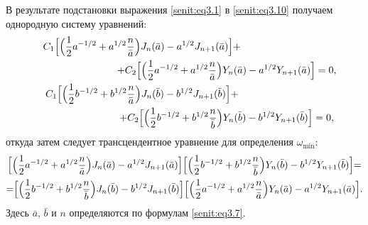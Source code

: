 В результате подстановки выражения \eqref{senit:eq3.1} в
\eqref{senit:eq3.10} получаем однородную систему уравнений:
\begin{gather*}
C_1 \Bigl[ \Bigl(\frac{1}{2} a^{-{1}/{2}}+a^{{1}/{2}}\frac{n}{\bar {a}} \Bigr)J_n
( \bar {a} )-a^{{1}/{2}}J_{n+1} ( \bar {a}) \Bigr]+\hspace{3cm}\\
\hspace{3cm}
+C_2 \Bigl[ \Bigl( \frac{1}{2} a^{-{1}/{2}}+a^{{1}/{2}}\frac{n}{\bar {a}} \Bigr)Y_n
(\bar {a})-a^{{1}/{2}}Y_{n+1} (\bar {a})\Bigr]=0,\\
C_1 \Bigl[
\Bigl(\frac{1}{2}b^{-{1}/{2}}+b^{{1}/{2}}\frac{n}{\bar{a}} \Bigr)J_n ( \bar {b})-b^{{1}/{2}}J_{n+1} ( \bar {b}) \Bigr]+\hspace{3cm}\\
\hspace{3cm}
+C_2 \Bigl[
\Bigl(\frac{1}{2}b^{-{1}/{2}}+b^{{1}/{2}}\frac{n}{\bar {b}} \Bigr)Y_n ( \bar {b})-b^{{1}/{2}}Y_{n+1}
(\bar {b})\Bigr]=0,
\end{gather*}
откуда затем следует трансцендентное уравнение для определения
$\omega_{\min}$:
\begin{multline}
\label{senit:eq3.11} 
\Bigl[ \Bigl( \frac{1}{2} a^{-{1}/{2}}+a^{{1}/{2}}\frac{n}{\bar {a}} \Bigr)J_n
( \bar {a} )-a^{{1}/{2}}J_{n+1} ( \bar {a}) \Bigr]
\Bigl[
\Bigl(\frac{1}{2}b^{-{1}/{2}}+b^{{1}/{2}}\frac{n}{\bar {b}}\Bigr)Y_n ( \bar {b} )-b^{{1}/{2}}Y_{n+1}
( \bar {b} )\Bigr]{=} \\
 {=}\Bigl[ \Bigl(\frac{1}{2}b^{-{1}/{2}}+b^{{1}/{2}}\frac{n}{\bar{b} }
\Bigr)J_n ( \bar {b} )-b^{{1}/{2}}J_{n+1}
(\bar {b}) \Bigr]
\Bigl[
\Bigl(\frac{1}{2}a^{-{1}/{2}}+a^{{1}/{2}}\frac{n}{\bar{a}}
\Bigr)Y_n ( \bar {a} )-a^{{1}/{2}}Y_{n+1} (\bar {a} )\Bigr].
\end{multline}
Здесь $\bar {a}$, $\bar {b}$ и $n$ определяются по формулам
\eqref{senit:eq3.7}.

\smallskip

